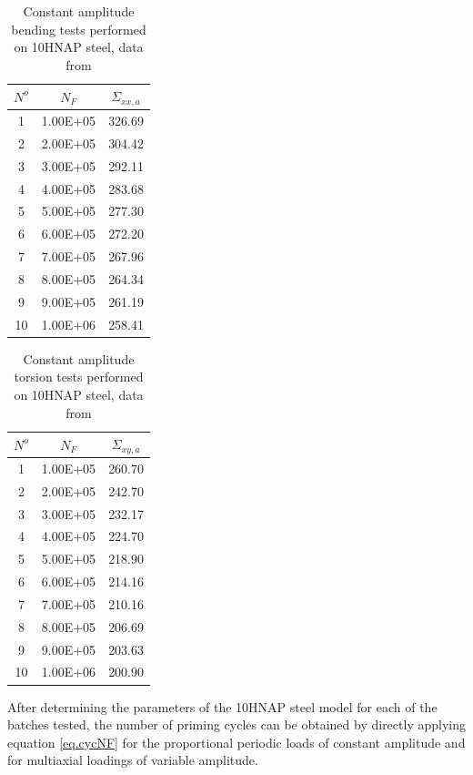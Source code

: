 \documentclass[3p,times,procedia,number]{elsarticle}
\begin{document}
\begin{table}[!h]
	\centering
	\begin{tabular}{ccc}
		\hline
		$N^o$ & $N_{F}$  & $\Sigma_{xx,a}$ \\ \hline
		1     & 1.00E+05 & 326.69     \\
		2     & 2.00E+05 & 304.42     \\
		3     & 3.00E+05 & 292.11     \\
		4     & 4.00E+05 & 283.68     \\
		5     & 5.00E+05 & 277.30     \\
		6     & 6.00E+05 & 272.20     \\
		7     & 7.00E+05 & 267.96     \\
		8     & 8.00E+05 & 264.34     \\
		9     & 9.00E+05 & 261.19     \\
		10    & 1.00E+06 & 258.41     \\ \hline
	\end{tabular}
	\caption{Constant amplitude bending tests performed on 10HNAP steel, data from \cite{VIDAL1996}}
	\label{tab.10HNAPbending}
\end{table}

\begin{table}[!h]
	\centering
	\begin{tabular}{ccc}
		\hline
		$N^o$ & $N_{F}$  & $\Sigma_{xy,a}$ \\ \hline
		1     & 1.00E+05 & 260.70          \\
		2     & 2.00E+05 & 242.70          \\
		3     & 3.00E+05 & 232.17          \\
		4     & 4.00E+05 & 224.70          \\
		5     & 5.00E+05 & 218.90          \\
		6     & 6.00E+05 & 214.16          \\
		7     & 7.00E+05 & 210.16          \\
		8     & 8.00E+05 & 206.69          \\
		9     & 9.00E+05 & 203.63          \\
		10    & 1.00E+06 & 200.90          \\ \hline
	\end{tabular}
	\caption{Constant amplitude torsion tests performed on 10HNAP steel, data from \cite{VIDAL1996}}
	\label{tab.10HNAPtorsion}
\end{table}


After determining the parameters of the 10HNAP steel model for each of the batches tested, the number of priming cycles can be obtained by directly applying equation \eqref{eq.cycNF} for the proportional periodic loads of constant amplitude and for multiaxial loadings of variable amplitude.
\end{document}
